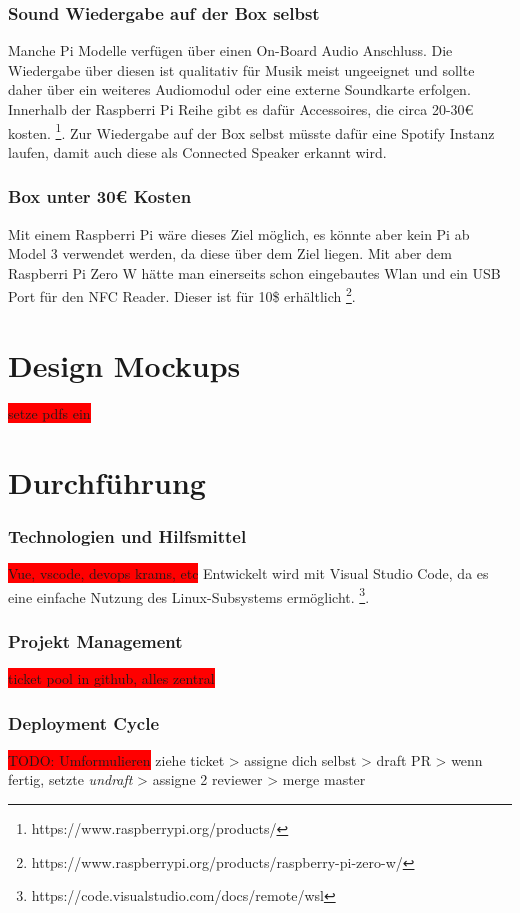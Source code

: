 \documentclass[10pt, a4paper, draft]{article}
\begin{document}
\subsubsection{Sound Wiedergabe auf der Box selbst}
Manche Pi Modelle verfügen über einen On-Board Audio Anschluss. Die Wiedergabe über diesen ist qualitativ für Musik meist ungeeignet und sollte daher über ein weiteres Audiomodul oder eine externe Soundkarte erfolgen.  Innerhalb der Raspberri Pi Reihe gibt es dafür Accessoires, die circa 20-30€ kosten. \footnote{https://www.raspberrypi.org/products/}.
Zur Wiedergabe auf der Box selbst müsste dafür eine Spotify Instanz laufen, damit auch diese als Connected Speaker erkannt wird.

\subsubsection{Box unter 30€ Kosten}
Mit einem Raspberri Pi wäre dieses Ziel möglich, es könnte aber kein Pi ab Model 3 verwendet werden, da diese über dem Ziel liegen.
Mit aber dem Raspberri Pi Zero W hätte man einerseits schon eingebautes Wlan und ein USB Port für den NFC Reader. Dieser ist für 10\$ erhältlich \footnote{https://www.raspberrypi.org/products/raspberry-pi-zero-w/}.

\section{Design Mockups}
\colorbox{red}{setze pdfs ein}

\section{Durchführung}
\subsubsection{Technologien und Hilfsmittel}
\colorbox{red}{Vue, vscode, devops krams, etc}
Entwickelt wird mit Visual Studio Code, da es eine einfache Nutzung des Linux-Subsystems ermöglicht. \footnote{https://code.visualstudio.com/docs/remote/wsl}.

\subsubsection{Projekt Management}
\colorbox{red}{ticket pool in github, alles zentral}

\subsubsection{Deployment Cycle}
\colorbox{red}{TODO: Umformulieren} ziehe ticket > assigne dich selbst > draft PR > wenn fertig, setzte \textit{undraft} > assigne 2 reviewer > merge master
\end{document}
